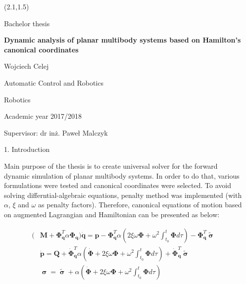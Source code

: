 \documentclass{beamer}
\newcommand{\bb}[1]{\mathbf{#1}}
\begin{document}
\begin{frame}
\justifying 

\begin{columns}
\begin{column}{0.05\paperwidth}
\end{column}
\begin{column}{0.425\paperwidth}
\justifying 

\begin{textblock}{17.8}(2.1,1.5)

\begin{center} 
{\Large Bachelor thesis}

\vskip0.75cm
{\LARGE \textbf{Dynamic analysis of planar multibody systems based on Hamilton's canonical coordinates}}

\vskip1cm
{\Large Wojciech Celej}

{\large Automatic Control and Robotics}

{\large Robotics}

{Academic year 2017/2018}

\vskip0.5cm
{\large Supervisor: dr inż. Paweł Malczyk}
\vskip1cm
\end{center} 
\end{textblock}

\vskip6.5cm

{\Large 1. Introduction}
\vskip8pt 

Main purpose of the thesis is to create universal solver for the forward dynamic simulation of planar multibody systems. In order to do that, various formulations were tested and canonical coordinates were selected. To avoid solving differntial-algebraic equations, penalty method was implemented (with $\alpha$, $\xi$ and $\omega$ as penalty factors). Therefore, canonical equations of motion based on augmented Lagrangian and Hamiltonian can be presented as below:

\begin{align} \label{eq1}
(&\bb{M} + \bb{\Phi}_\bb{q}^T \alpha \bb{\Phi}_\bb{q})\bb{\dot{q}} = \bb{p} -\bb{\Phi}_\bb{q}^T \alpha \left(2\xi \omega \bb{\Phi} + \omega^2 \int_{t_0}^{t}\bb{\Phi} d\tau \right) - \bb{\Phi}_\bb{q}^T \bm{\widetilde{\upsigma}} \\ \label{eq2}
&\bb{\dot{p}}=\bb{Q} + \bb{\dot{\Phi}}_\bb{q}^T \alpha \left( \bb{\dot{\Phi}} + 2\xi\omega \bb{\Phi} + \omega^2 \int_{t_0}^{t}\bb{\Phi} d\tau \right) + \bb{\dot{\Phi}}_\bb{q}^T \bm{\widetilde{\upsigma}} \\
&\bm{\upsigma}=\bm{\widetilde{\upsigma}}+\alpha \left(\bb{\dot{\Phi}} + 2\xi \omega \bb{\Phi} + \omega^2 \int_{t_0}^{t}\bb{\Phi} d\tau \right)
\end{align}


\end{column}
\end{columns}
\end{frame}
\end{document}
